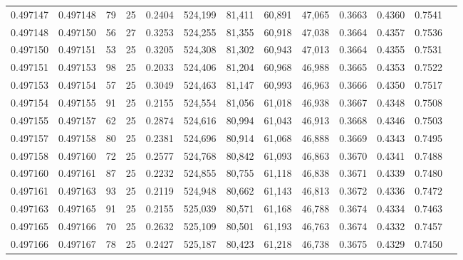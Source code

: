\begin{tabular}{rrrrrrrrrrrrr}
0.497147 & 0.497148 &    79 &  25 &                                     0.2404 & 524,199 &  81,411 &  60,891 &  47,065 & 0.3663 & 0.4360 & 0.7541 \\
0.497148 & 0.497150 &    56 &  27 &                                     0.3253 & 524,255 &  81,355 &  60,918 &  47,038 & 0.3664 & 0.4357 & 0.7536 \\
0.497150 & 0.497151 &    53 &  25 &                                     0.3205 & 524,308 &  81,302 &  60,943 &  47,013 & 0.3664 & 0.4355 & 0.7531 \\
0.497151 & 0.497153 &    98 &  25 &                                     0.2033 & 524,406 &  81,204 &  60,968 &  46,988 & 0.3665 & 0.4353 & 0.7522 \\
0.497153 & 0.497154 &    57 &  25 &                                     0.3049 & 524,463 &  81,147 &  60,993 &  46,963 & 0.3666 & 0.4350 & 0.7517 \\
0.497154 & 0.497155 &    91 &  25 &                                     0.2155 & 524,554 &  81,056 &  61,018 &  46,938 & 0.3667 & 0.4348 & 0.7508 \\
0.497155 & 0.497157 &    62 &  25 &                                     0.2874 & 524,616 &  80,994 &  61,043 &  46,913 & 0.3668 & 0.4346 & 0.7503 \\
0.497157 & 0.497158 &    80 &  25 &                                     0.2381 & 524,696 &  80,914 &  61,068 &  46,888 & 0.3669 & 0.4343 & 0.7495 \\
0.497158 & 0.497160 &    72 &  25 &                                     0.2577 & 524,768 &  80,842 &  61,093 &  46,863 & 0.3670 & 0.4341 & 0.7488 \\
0.497160 & 0.497161 &    87 &  25 &                                     0.2232 & 524,855 &  80,755 &  61,118 &  46,838 & 0.3671 & 0.4339 & 0.7480 \\
0.497161 & 0.497163 &    93 &  25 &                                     0.2119 & 524,948 &  80,662 &  61,143 &  46,813 & 0.3672 & 0.4336 & 0.7472 \\
0.497163 & 0.497165 &    91 &  25 &                                     0.2155 & 525,039 &  80,571 &  61,168 &  46,788 & 0.3674 & 0.4334 & 0.7463 \\
0.497165 & 0.497166 &    70 &  25 &                                     0.2632 & 525,109 &  80,501 &  61,193 &  46,763 & 0.3674 & 0.4332 & 0.7457 \\
0.497166 & 0.497167 &    78 &  25 &                                     0.2427 & 525,187 &  80,423 &  61,218 &  46,738 & 0.3675 & 0.4329 & 0.7450 \\

\end{tabular}
